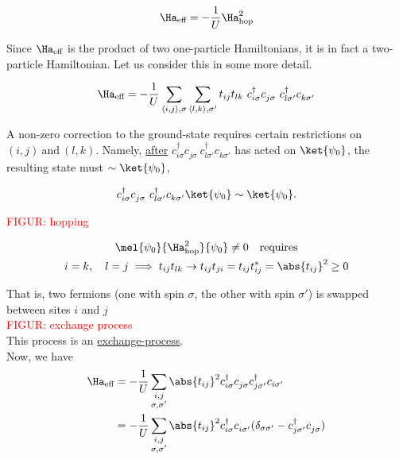 \begin{equation}
    \Ha_{\text{eff}} = -\frac{1}{U} \Ha_{\text{hop}}^2
\end{equation}

Since $\Ha_{\text{eff}}$  is the product of two one-particle Hamiltonians, it is in fact a two-particle Hamiltonian. Let us consider this in some more detail.

\begin{equation}
    \Ha_{\text{eff}} = -\frac{1}{U} \sum_{\langle i, j \rangle, \sigma}  \sum_{\langle l, k \rangle , \sigma'} t_{ij} t_{lk} \ c_{i \sigma}^\dagger c_{j \sigma}^{} \ c_{l \sigma'}^\dagger c_{k \sigma'}^{}
\end{equation}

A non-zero correction to the ground-state requires certain restrictions on $(i, j) \ \text{and} \ (l,k)$. Namely, \underline{after} $c_{i \sigma}^\dagger c_{j \sigma}^{} \ c_{l \sigma'}^\dagger c_{k \sigma'}^{}$ has acted on $\ket{\psi_0}$, the resulting state must $\sim \ket{\psi_0}$,

\begin{equation}
    c_{i \sigma}^\dagger c_{j \sigma}^{} \ c_{l \sigma'}^\dagger c_{k \sigma'}^{} \ket{\psi_0} \sim \ket{\psi_0}.
\end{equation}

\textcolor{red}{FIGUR: hopping}

\begin{gather}
    \mel{\psi_0}{\Ha_{\text{hop}}^2}{\psi_0} \ne 0 \quad \text{requires} \\
    i = k, \quad l = j \implies t_{ij}t_{lk} \rightarrow t_{ij}t_{ji} = t_{ij}t_{ij}^* = \abs{t_{ij}}^2 \geq 0
\end{gather}

That is, two fermions (one with spin $\sigma$, the other with spin $\sigma'$) is swapped between sites $i$ and $j$ \\

\textcolor{red}{FIGUR: exchange process}\\

This process is an \underline{exchange-process}. \\

Now, we have
\begin{align}
    \Ha_{\text{eff}} &= -\frac{1}{U} \sum_{\substack{i, j \\ \sigma, \sigma'}} \abs{t_{ij}}^2 c_{i \sigma}^\dagger c_{j \sigma}^{} c_{j \sigma'}^\dagger c_{i \sigma'} \\
    &= -\frac{1}{U} \sum_{\substack{i, j \\ \sigma, \sigma'}} \abs{t_{ij}}^2 c_{i \sigma}^\dagger c_{i \sigma'}^{} (\delta_{\sigma \sigma'} - c_{j \sigma'}^\dagger c_{j \sigma}^{})
\end{align}

